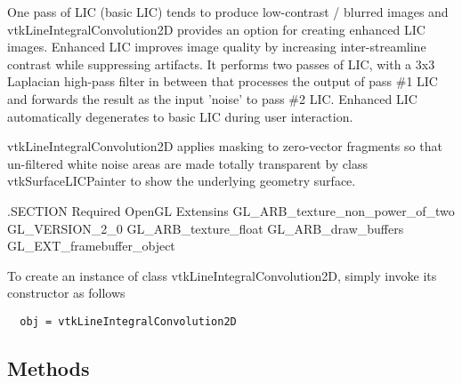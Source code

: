   One pass of LIC (basic LIC) tends to produce low-contrast / blurred images and
  vtkLineIntegralConvolution2D provides an option for creating enhanced LIC
  images. Enhanced LIC improves image quality by increasing inter-streamline
  contrast while suppressing artifacts. It performs two passes of LIC, with a
  3x3 Laplacian high-pass filter in between that processes the output of pass
  \#1 LIC and forwards the result as the input 'noise' to pass \#2 LIC. Enhanced
  LIC automatically degenerates to basic LIC during user interaction.

  vtkLineIntegralConvolution2D applies masking to zero-vector fragments so
  that un-filtered white noise areas are made totally transparent by class
  vtkSurfaceLICPainter to show the underlying geometry surface.

 .SECTION Required OpenGL Extensins
  GL\_ARB\_texture\_non\_power\_of\_two
  GL\_VERSION\_2\_0
  GL\_ARB\_texture\_float
  GL\_ARB\_draw\_buffers
  GL\_EXT\_framebuffer\_object


To create an instance of class vtkLineIntegralConvolution2D, simply
invoke its constructor as follows
\begin{verbatim}
  obj = vtkLineIntegralConvolution2D
\end{verbatim}
\subsection{Methods}

